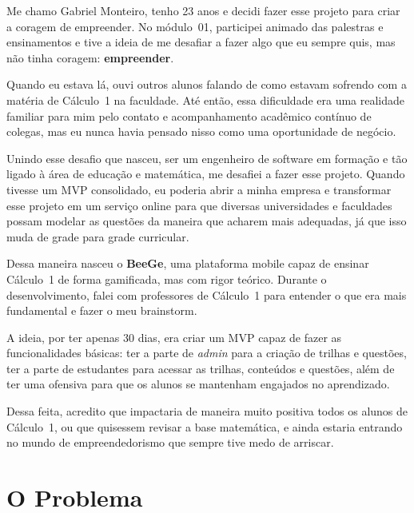 \documentclass[12pt, a4paper]{article}
\begin{document}
\begin{destaque}
Me chamo Gabriel Monteiro, tenho 23 anos e decidi fazer esse projeto para criar a coragem de empreender. No m\'{o}dulo~01, participei animado das palestras e ensinamentos e tive a ideia de me desafiar a fazer algo que eu sempre quis, mas n\~{a}o tinha coragem: \textbf{empreender}.

Quando eu estava l\'{a}, ouvi outros alunos falando de como estavam sofrendo com a mat\'{e}ria de C\'{a}lculo~1 na faculdade. At\'{e} ent\~{a}o, essa dificuldade era uma realidade familiar para mim pelo contato e acompanhamento acad\^{e}mico cont\'{i}nuo de colegas, mas eu nunca havia pensado nisso como uma oportunidade de neg\'{o}cio.

Unindo esse desafio que nasceu, ser um engenheiro de software em forma\c{c}\~{a}o e t\~{a}o ligado \`{a} \'{a}rea de educa\c{c}\~{a}o e matem\'{a}tica, me desafiei a fazer esse projeto. Quando tivesse um MVP consolidado, eu poderia abrir a minha empresa e transformar esse projeto em um servi\c{c}o online para que diversas universidades e faculdades possam modelar as quest\~{o}es da maneira que acharem mais adequadas, j\'{a} que isso muda de grade para grade curricular.

Dessa maneira nasceu o \textbf{BeeGe}, uma plataforma mobile capaz de ensinar C\'{a}lculo~1 de forma gamificada, mas com rigor te\'{o}rico. Durante o desenvolvimento, falei com professores de C\'{a}lculo~1 para entender o que era mais fundamental e fazer o meu brainstorm.

A ideia, por ter apenas 30 dias, era criar um MVP capaz de fazer as funcionalidades b\'{a}sicas: ter a parte de \textit{admin} para a cria\c{c}\~{a}o de trilhas e quest\~{o}es, ter a parte de estudantes para acessar as trilhas, conte\'{u}dos e quest\~{o}es, al\'{e}m de ter uma ofensiva para que os alunos se mantenham engajados no aprendizado.

Dessa feita, acredito que impactaria de maneira muito positiva todos os alunos de C\'{a}lculo~1, ou que quisessem revisar a base matem\'{a}tica, e ainda estaria entrando no mundo de empreendedorismo que sempre tive medo de arriscar.
\end{destaque}

\section{O Problema}
\end{document}
